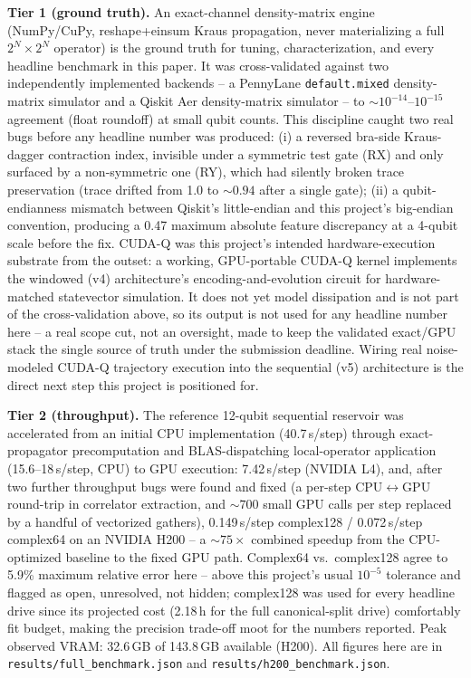 \documentclass[11pt,twocolumn]{article}
\begin{document}
\textbf{Tier 1 (ground truth).} An exact-channel density-matrix engine (NumPy/CuPy,
reshape+einsum Kraus propagation, never materializing a full $2^N\times2^N$ operator) is the
ground truth for tuning, characterization, and every headline benchmark in this paper. It was
cross-validated against two independently implemented backends -- a PennyLane
\texttt{default.mixed} density-matrix simulator and a Qiskit Aer density-matrix simulator -- to
$\sim\!10^{-14}$--$10^{-15}$ agreement (float roundoff) at small qubit counts. This discipline
caught two real bugs before any headline number was produced: (i) a reversed bra-side Kraus-dagger
contraction index, invisible under a symmetric test gate (RX) and only surfaced by a non-symmetric
one (RY), which had silently broken trace preservation (trace drifted from 1.0 to $\sim\!0.94$
after a single gate); (ii) a qubit-endianness mismatch between Qiskit's little-endian and this
project's big-endian convention, producing a 0.47 maximum absolute feature discrepancy at a
4-qubit scale before the fix. CUDA-Q was this project's intended hardware-execution substrate from
the outset: a working, GPU-portable CUDA-Q kernel implements the windowed (v4) architecture's
encoding-and-evolution circuit for hardware-matched statevector simulation. It does not yet model
dissipation and is not part of the cross-validation above, so its output is not used for any
headline number here -- a real scope cut, not an oversight, made to keep the validated exact/GPU
stack the single source of truth under the submission deadline. Wiring real noise-modeled CUDA-Q
trajectory execution into the sequential (v5) architecture is the direct next step this project is
positioned for.

\textbf{Tier 2 (throughput).} The reference 12-qubit sequential reservoir was accelerated from an
initial CPU implementation (40.7\,s/step) through exact-propagator precomputation and
BLAS-dispatching local-operator application (15.6--18\,s/step, CPU) to GPU execution: 7.42\,s/step
(NVIDIA L4), and, after two further throughput bugs were found and fixed (a per-step
CPU$\leftrightarrow$GPU round-trip in correlator extraction, and $\sim\!700$ small GPU calls per
step replaced by a handful of vectorized gathers), 0.149\,s/step complex128 / 0.072\,s/step
complex64 on an NVIDIA H200 -- a $\sim\!75\times$ combined speedup from the CPU-optimized baseline
to the fixed GPU path. Complex64 vs.\ complex128 agree to 5.9\% maximum relative error here --
above this project's usual $10^{-5}$ tolerance and flagged as open, unresolved, not hidden;
complex128 was used for every headline drive since its projected cost (2.18\,h for the full
canonical-split drive) comfortably fit budget, making the precision trade-off moot for the
numbers reported. Peak observed VRAM: 32.6\,GB of 143.8\,GB available (H200). All figures here are
in \texttt{results/full\_benchmark.json} and \texttt{results/h200\_benchmark.json}.
\end{document}
